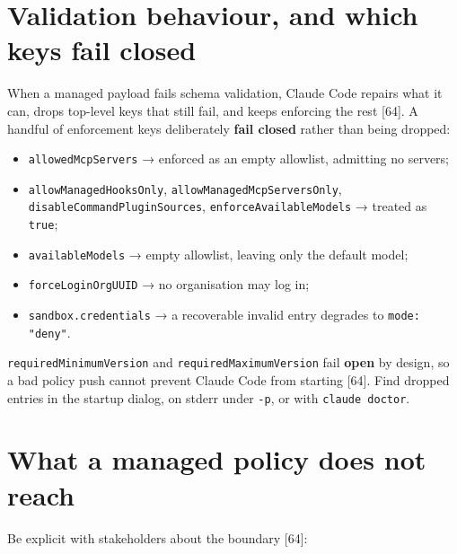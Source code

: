 \documentclass[11pt,a4paper,twoside,openany]{book}
\begin{document}
\FloatBarrier
\setcounter{section}{2}
\section{Validation behaviour, and which keys fail closed}

When a managed payload fails schema validation, Claude Code repairs what it can, drops top-level keys that still fail, and keeps enforcing the rest [64]. A handful of enforcement keys deliberately \textbf{fail closed} rather than being dropped:


\begin{itemize}
\item \texttt{allowed\allowbreak{}Mcp\allowbreak{}Servers} → enforced as an empty allowlist, admitting no servers;
\item \texttt{allow\allowbreak{}Managed\allowbreak{}Hooks\allowbreak{}Only}, \texttt{allow\allowbreak{}Managed\allowbreak{}Mcp\allowbreak{}Servers\allowbreak{}Only}, \texttt{disable\allowbreak{}Command\allowbreak{}Plugin\allowbreak{}Sources}, \texttt{enforce\allowbreak{}Available\allowbreak{}Models} → treated as \texttt{true};
\item \texttt{available\allowbreak{}Models} → empty allowlist, leaving only the default model;
\item \texttt{force\allowbreak{}Login\allowbreak{}Org\allowbreak{}UUID} → no organisation may log in;
\item \texttt{sandbox.\allowbreak{}credentials} → a recoverable invalid entry degrades to \texttt{mode:\allowbreak{} "deny"}.
\end{itemize}

\texttt{required\allowbreak{}Minimum\allowbreak{}Version} and \texttt{required\allowbreak{}Maximum\allowbreak{}Version} fail \textbf{open} by design, so a bad policy push cannot prevent Claude Code from starting [64]. Find dropped entries in the startup dialog, on stderr under \texttt{-\allowbreak{}p}, or with \texttt{claude doct\allowbreak{}or}.


\FloatBarrier
\setcounter{section}{3}
\section{What a managed policy does not reach}

Be explicit with stakeholders about the boundary [64]:
\end{document}
